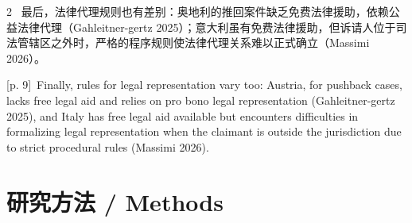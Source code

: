 \documentclass[10pt,a4paper]{article}
\begin{document}
\begin{paracol}{2}
\switchcolumn*
{\scriptsize\color{gray} [p. 9]}\ 最后，法律代理规则也有差别：奥地利的推回案件缺乏免费法律援助，依赖公益法律代理（Gahleitner-gertz 2025）；意大利虽有免费法律援助，但诉请人位于司法管辖区之外时，严格的程序规则使法律代理关系难以正式确立（Massimi 2026）。\par
\switchcolumn
{\scriptsize\color{gray} [p. 9]}\ Finally, rules for legal representation vary too: Austria, for pushback cases, lacks free legal aid and relies on pro bono legal representation (Gahleitner-gertz 2025), and Italy has free legal aid available but encounters difficulties in formalizing legal representation when the claimant is outside the jurisdiction due to strict procedural rules (Massimi 2026).\par
\switchcolumn*
\end{paracol}
\section*{研究方法 / Methods}
\end{document}
